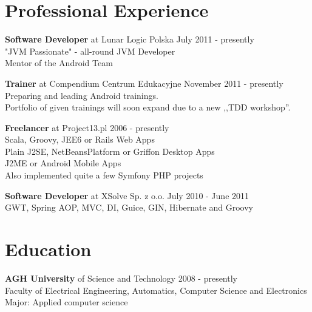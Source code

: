 \documentclass{res}
\begin{document}
 
 
 
\address{{\bf Konrad Malawski} \\
	10.01.1989, Vienna \\
	mobile: +48 602 36 66 55 \\
	}
\address{
	email: konrad.malawski@project13.pl \\
    \textbf{linkedin: linkedin.com/in/konradmalawski} \\
	\textbf{github: github.com/ktoso} \\
	blog: \url{blog.project13.pl} \\
}

\begin{resume} 

\section{Professional Experience}
{\bf Software Developer} at Lunar Logic Polska \hfill July 2011 - presently \\ 
    "JVM Passionate" - all-round JVM Developer \\ 
    Mentor of the Android Team 

{\bf Trainer} at Compendium Centrum Edukacyjne \hfill November 2011 - presently \\ 
	Preparing and leading Android trainings. \\
	Portfolio of given trainings will soon expand due to a new ,,TDD workshop''. 

{\bf Freelancer} at Project13.pl \hfill 2006 - presently\\
	Scala, Groovy, JEE6 or Rails Web Apps \\
	Plain J2SE, NetBeansPlatform or Griffon Desktop Apps \\
	J2ME or Android Mobile Apps \\
	Also implemented quite a few Symfony PHP projects


{\bf Software Developer} at XSolve Sp. z o.o. \hfill July 2010 - June 2011\\
	GWT, Spring {AOP, MVC, DI}, Guice, GIN, Hibernate and Groovy

\section{Education} 
{\bf AGH University} of Science and Technology \hfill 2008 - presently\\
	Faculty of Electrical Engineering, Automatics, Computer Science and Electronics\\
	Major: Applied computer science


\end{resume}
\end{document}
